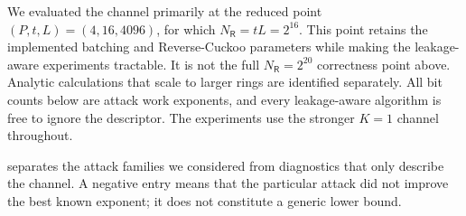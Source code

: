 We evaluated the channel primarily at the reduced point
$(P,t,L)=(4,16,4096)$, for which $N_{\mathsf R}=tL=2^{16}$.  This point retains
the implemented batching and Reverse-Cuckoo parameters while making the
leakage-aware experiments tractable.  It is not the full
$N_{\mathsf R}=2^{20}$ correctness point above.  Analytic calculations that
scale to larger rings are identified separately.  All bit counts below are
attack work exponents, and every leakage-aware algorithm is free to ignore the
descriptor.  The experiments use the stronger $K=1$ channel throughout.

 separates the attack families we
considered from diagnostics that only describe the channel.  A negative entry
means that the particular attack did not improve the best known exponent; it
does not constitute a generic lower bound.

